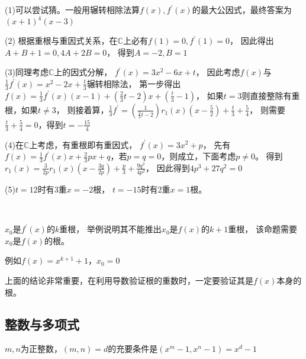 \begin{solution}
  (1)可以尝试猜。一般用辗转相除法算$f(x),f^{\prime}(x)$的最大公因式，最终答案为$(x + 1)^4(x - 3)$

  (2)
  根据重根与重因式关系，在$\mathbb{C}$上必有$f(1) = 0, f^{\prime}(1) = 0$，
  因此得出$A + B + 1 = 0, 4A + 2B = 0$，
  得到$A = -2, B = 1$

  (3)同理考虑$\mathbb{C}$上的因式分解，
  $f^{\prime}(x) = 3x^2 - 6x + t$，
  因此考虑$f(x)$与$\frac{1}{3}f^{\prime}(x) = x^2 - 2x + \frac{t}{3}$辗转相除法，
  第一步得出$f(x) = \frac{1}{3}f^{\prime}(x) (x - 1) + (\frac{2}{3}t - 2)x + (\frac{t}{3} - 1)$，
  如果$t = 3$则直接整除有重根，如果$t \neq 3$，
  则接着算，$\frac{1}{3}f^{\prime} = (\frac{1}{\frac{2}{3}t - 2})r_1(x)(x - \frac{5}{2}) + \frac{t}{3} + \frac{5}{4}$，
  则需要$\frac{t}{3} + \frac{5}{4} = 0$，得到$t = -\frac{15}{4}$

  (4)在$\mathbb{C}$上考虑，有重根即有重因式，
  $f^{\prime}(x) = 3x^2 + p$，
  先有$f(x) = \frac{1}{3}f^{\prime}(x)x + \frac{2}{3}px + q$，若$p = q = 0$，则成立，下面考虑$p \neq 0$。
  得到$r_1(x) = \frac{3}{2p}r_1(x)(x - \frac{3q}{2p}) + \frac{p}{3} + \frac{9q^2}{4p^2}$，
  因此得到$4p^3 + 27q^2 = 0$

  (5)$t = 12$时有$3$重$x = -2$根，
  $t = -15$时有$2$重$x = 1$根。
\end{solution}


~

\begin{exercise}[导数重根反推函数重根？]
  $x_0$是$f^{\prime}(x)$的$k$重根，
  举例说明其不能推出$x_0$是$f(x)$的$k+1$重根，
  该命题需要$x_0$是$f(x)$的根。
\end{exercise}

\begin{solution}
  例如$f(x) = x^{k+1} + 1$，$x_0 = 0$
\end{solution}

\begin{note}
  上面的结论非常重要，在利用导数验证根的重数时，一定要验证其是$f(x)$本身的根。
\end{note}




\subsection{整数与多项式}


\begin{theorem}[整数与多项式]
  $m,n$为正整数，$(m,n) = d$的充要条件是$(x^m - 1, x^n - 1) = x^d - 1$
\end{theorem}

